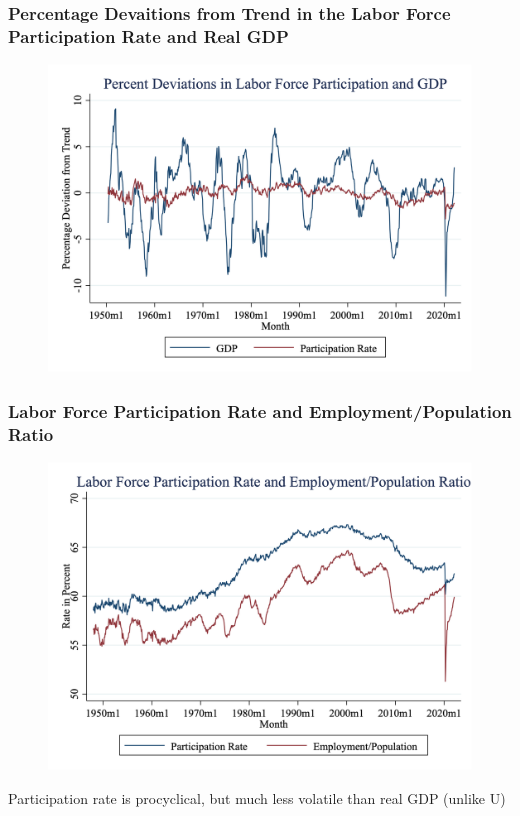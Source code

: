 \documentclass{beamer}
\begin{document}
\begin{frame}
\frametitle[alignment=center]{Percentage Devaitions from Trend in the Labor Force Participation Rate and Real GDP}
\begin{figure}
\centering
\includegraphics[scale=0.23]{Figures/Fig_6pt5.png}
\end{figure}
\end{frame}

\begin{frame}
\frametitle[alignment=center]{Labor Force Participation Rate and Employment/Population Ratio}
\begin{figure}
\centering
\includegraphics[scale=0.23]{Figures/Fig_6pt6.png}
\end{figure}
Participation rate is procyclical, but much less volatile than real GDP (unlike U)
\end{frame}
\end{document}
